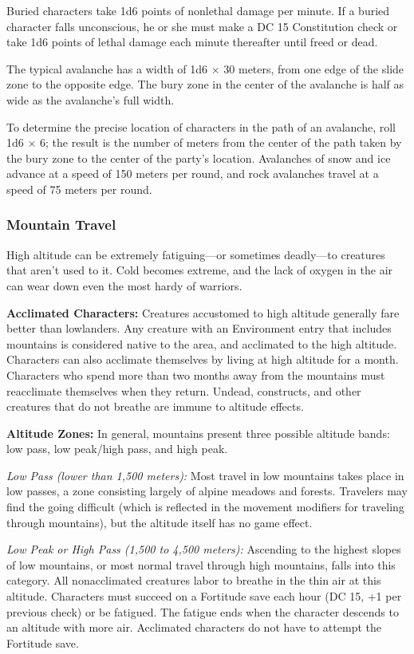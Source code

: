 Buried characters take 1d6 points of nonlethal damage per minute. If a buried character falls unconscious, he or she must make a DC 15 Constitution check or take 1d6 points of lethal damage each minute thereafter until freed or dead.

The typical avalanche has a width of 1d6 $\times$ 30 meters, from one edge of the slide zone to the opposite edge. The bury zone in the center of the avalanche is half as wide as the avalanche's full width.

To determine the precise location of characters in the path of an avalanche, roll 1d6 $\times$ 6; the result is the number of meters from the center of the path taken by the bury zone to the center of the party's location. Avalanches of snow and ice advance at a speed of 150 meters per round, and rock avalanches travel at a speed of 75 meters per round.

\subsubsection{Mountain Travel}
High altitude can be extremely fatiguing---or sometimes deadly---to creatures that aren't used to it. Cold becomes extreme, and the lack of oxygen in the air can wear down even the most hardy of warriors.

\textbf{Acclimated Characters:} Creatures accustomed to high altitude generally fare better than lowlanders. Any creature with an Environment entry that includes mountains is considered native to the area, and acclimated to the high altitude. Characters can also acclimate themselves by living at high altitude for a month. Characters who spend more than two months away from the mountains must reacclimate themselves when they return. Undead, constructs, and other creatures that do not breathe are immune to altitude effects.

\textbf{Altitude Zones:} In general, mountains present three possible altitude bands: low pass, low peak/high pass, and high peak.

\textit{Low Pass (lower than 1,500 meters):} Most travel in low mountains takes place in low passes, a zone consisting largely of alpine meadows and forests. Travelers may find the going difficult (which is reflected in the movement modifiers for traveling through mountains), but the altitude itself has no game effect.

\textit{Low Peak or High Pass (1,500 to 4,500 meters):} Ascending to the highest slopes of low mountains, or most normal travel through high mountains, falls into this category. All nonacclimated creatures labor to breathe in the thin air at this altitude. Characters must succeed on a Fortitude save each hour (DC 15, +1 per previous check) or be fatigued. The fatigue ends when the character descends to an altitude with more air. Acclimated characters do not have to attempt the Fortitude save.

